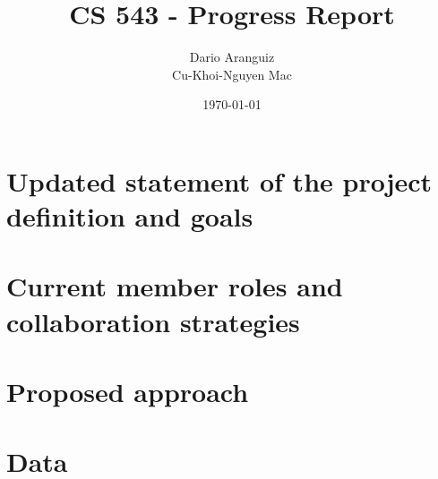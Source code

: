 \documentclass[paper=letter, fontsize=12pt]{article}
\title{CS 543 - Progress Report}
\author{
        Dario Aranguiz \\
        Cu-Khoi-Nguyen Mac
        }
\date{\today}
\begin{document}
\maketitle

\section{Updated statement of the project definition and goals}

\section{Current member roles and collaboration strategies}

\section{Proposed approach}

\section{Data}
\end{document}
